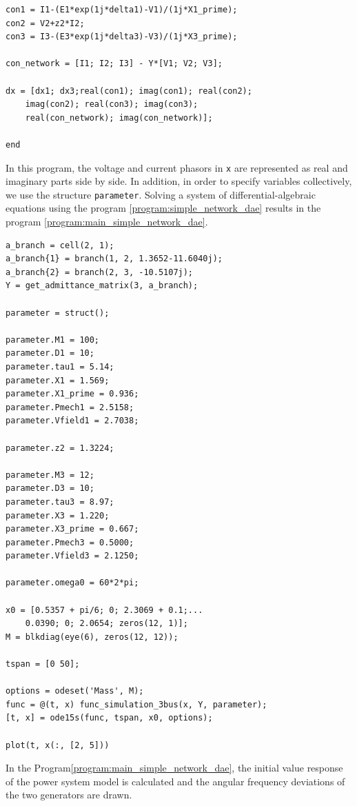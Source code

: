 \documentclass[graybox, envcountchap]{svmult}
\begin{document}
\begin{example}
\begin{PROGRAMA}[count,title={func\_simulation\_3bus.m}]
\begin{verbatim}
con1 = I1-(E1*exp(1j*delta1)-V1)/(1j*X1_prime);
con2 = V2+z2*I2;
con3 = I3-(E3*exp(1j*delta3)-V3)/(1j*X3_prime);

con_network = [I1; I2; I3] - Y*[V1; V2; V3];

dx = [dx1; dx3;real(con1); imag(con1); real(con2);
    imag(con2); real(con3); imag(con3);
    real(con_network); imag(con_network)];

end
\end{verbatim}
\end{PROGRAMA}

In this program, the voltage and current phasors in \verb|x| are represented as real and imaginary parts side by side.
In addition, in order to specify variables collectively, we use the structure \verb|parameter|.
Solving a system of differential-algebraic equations using the program \ref{program:simple_network_dae} results in the program \nobreak\ref{program:main_simple_network_dae}.

\smallskip
\begin{PROGRAMA}[count,title={main\_simulation\_simple.m}]\label{program:main_simple_network_dae}
\begin{verbatim}
a_branch = cell(2, 1);
a_branch{1} = branch(1, 2, 1.3652-11.6040j);
a_branch{2} = branch(2, 3, -10.5107j);
Y = get_admittance_matrix(3, a_branch);

parameter = struct();

parameter.M1 = 100;
parameter.D1 = 10;
parameter.tau1 = 5.14;
parameter.X1 = 1.569;
parameter.X1_prime = 0.936;
parameter.Pmech1 = 2.5158;
parameter.Vfield1 = 2.7038;

parameter.z2 = 1.3224;

parameter.M3 = 12;
parameter.D3 = 10;
parameter.tau3 = 8.97;
parameter.X3 = 1.220;
parameter.X3_prime = 0.667;
parameter.Pmech3 = 0.5000;
parameter.Vfield3 = 2.1250;

parameter.omega0 = 60*2*pi;

x0 = [0.5357 + pi/6; 0; 2.3069 + 0.1;...
    0.0390; 0; 2.0654; zeros(12, 1)];
M = blkdiag(eye(6), zeros(12, 12));

tspan = [0 50];

options = odeset('Mass', M);
func = @(t, x) func_simulation_3bus(x, Y, parameter);
[t, x] = ode15s(func, tspan, x0, options); 

plot(t, x(:, [2, 5]))
\end{verbatim}
\end{PROGRAMA}

In the Program\nobreak\ref{program:main_simple_network_dae},
the initial value response of the power system model is calculated and the angular frequency deviations of the two generators are drawn.
\end{example}
\end{document}

